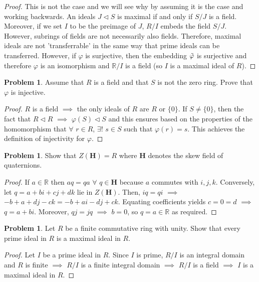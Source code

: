 \documentclass[11pt]{article}
\theoremstyle{definition}
\newtheorem{prob}[thm]{Problem}
\numberwithin{equation}{section}
\newcommand{\R}{\mathbb{R}}  %
\begin{document}
\begin{proof}
 This is not the case and we will see why by assuming it is the case and working backwards. An ideals $J \vartriangleleft S$ is maximal if and only if $S/J$ is a field. Moreover, if we set $I$ to be the preimage of $J$, $R/I$ embeds the field $S/J$. However, subrings of fields are not necessarily also fields. Therefore, maximal ideals are not 'transferrable' in the same way that prime ideals can be transferred. However, if $\varphi$ is surjective, then the embedding $\Tilde{\varphi}$ is surjective and therefore $\varphi$ is an isomorphism and $\R/I$ is a field (so $I$ is a maximal ideal of $R$).
\end{proof}

\begin{prob}
Assume that $R$ is a field and that $S$ is not the zero ring. Prove that $\varphi$ is injective.
\end{prob}

\begin{proof}
$R$ is a field $\implies$ the only ideals of $R$ are $R$ or $\{0\}$. If $S \neq \{0\}$, then the fact that $R \vartriangleleft R$ $\implies$ $\varphi(S) \vartriangleleft S$ and this ensures based on the properties of the homomorphism that $\forall$ $r \in R$, $\exists$! $s \in S$ such that $\varphi(r) = s$. This achieves the definition of injectivity for $\varphi$.
\end{proof}

\begin{prob}
Show that $Z(\textbf{H}) = R$ where $\textbf{H}$ denotes the skew field of quaternions.
\end{prob}

\begin{proof}
If $a \in \R$ then $aq = qa$ $\forall$ $q \in \textbf{H}$ because $a$ commutes with $i, j, k$. Conversely, let $q = a+bi+cj+dk$ lie in $Z(\textbf{H})$. Then, $iq = qi$ $\implies$ $-b+a+dj-ck=-b+ai-dj+ck$. Equating coefficients yields $c = 0 = d$ $\implies$ $q = a+bi$. Moreover, $qj = jq$ $\implies$ $b = 0$, so $q=a \in \R$ as required.
\end{proof}

\begin{prob}
Let $R$ be a finite commutative ring with unity. Show that every prime ideal in $R$ is a maximal ideal in $R$.
\end{prob}

\begin{proof}
Let $I$ be a prime ideal in $R$. Since $I$ is prime, $R/I$ is an integral domain and $R$ is finite $\implies$ $R/I$ is a finite integral domain $\implies$ $R/I$ is a field $\implies$ $I$ is a maximal ideal in $R$.
\end{proof}
\end{document}
